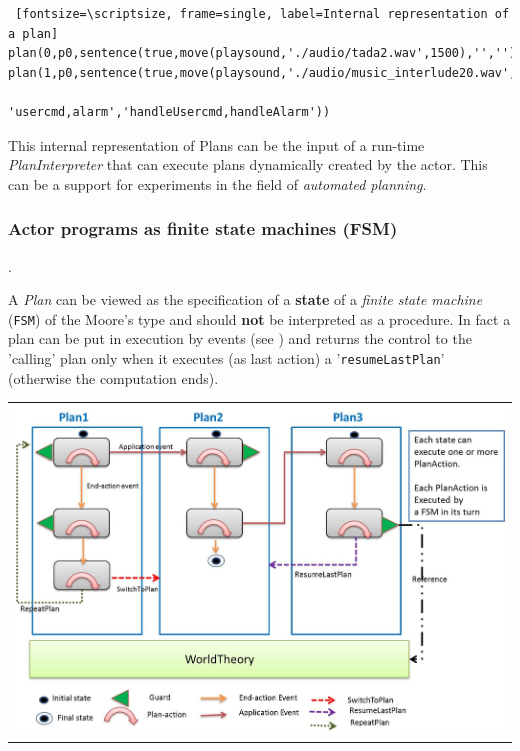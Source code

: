 \begin{Verbatim} [fontsize=\scriptsize, frame=single, label=Internal representation of a plan]		
plan(0,p0,sentence(true,move(playsound,'./audio/tada2.wav',1500),'',''))
plan(1,p0,sentence(true,move(playsound,'./audio/music_interlude20.wav',20000),
	                                     'usercmd,alarm','handleUsercmd,handleAlarm'))
\end{Verbatim} 

This internal representation of Plans can be the input of a run-time \textit{PlanInterpreter} that can execute plans dynamically created by the actor. This can be a support for experiments in the field of \textit{automated planning}.

\subsubsection{Actor programs as finite state machines (FSM)}.\\

A \textit{Plan} can be viewed as the specification of a \textbf{state} of a \textit{finite state machine} (\texttt{FSM}) of the Moore's type  and should \textbf{not} be interpreted as a procedure. In fact a plan can be put in execution by events (see ) and returns the control to the 'calling' plan only when it executes (as last action) a '\texttt{resumeLastPlan}'  (otherwise the computation ends). 

\begin{center}
\begin{tabular}{ c }
     \includegraphics[scale = 0.55]{img/planFSM.jpg}\\
\end{tabular}{   }
\end{center}

